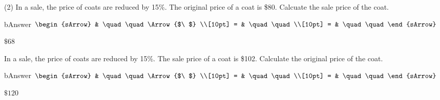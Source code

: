 \clearpage\noindent%
\begin{mtask}[resume](2)
  \task In a sale, the price of coats are reduced by 15\%. The original price of a coat is \$80. Calcuate the sale price of the coat.
      \begin{envOut}[height=6cm]{bAnswer}
	       $\begin{sArrow}
	             & \quad\quad       \Arrow{$\ $} \\[10pt]
               = & \quad\quad               \\[10pt]      
			   = & \quad\quad  
	        \end{sArrow}$
      \end{envOut}
	  \begin{shortsolution}  
	     $\$68$
 	  \end{shortsolution}

  \task In a sale, the price of coats are reduced by 15\%. The sale price of a coat is \$102. Calculate the original price of the coat.
      \begin{envOut}[height=6cm]{bAnswer}
	       $\begin{sArrow}
	             & \quad\quad       \Arrow{$\ $} \\[10pt]
               = & \quad\quad               \\[10pt]      
			   = & \quad\quad  
	        \end{sArrow}$
      \end{envOut}
	  \begin{shortsolution}  
	     $\$120$
 	  \end{shortsolution} 
\end{mtask}

